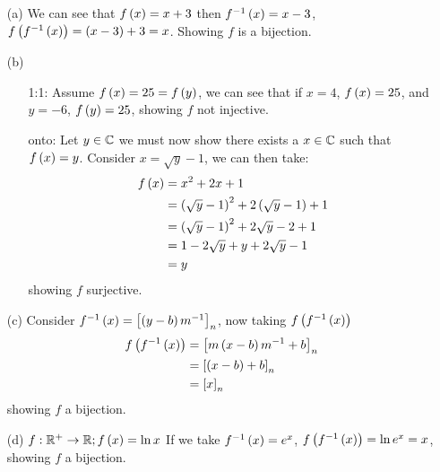 \begin{mdframed}[style=darkAnswer,frametitle={Joe Starr}]
  \begin{itemize}
    \item [(a)]{ We can see that $f\left(x\right)=x+3$ then $f^{-1}\left(x\right)=x-3$,
          $f\left(f^{-1}\left(x\right)\right)=\left(x-3\right)+3=x$. Showing $f$ is a bijection.
          }
    \item [(b)]{
          \begin{itemize}
            \item[1:1:]{\hspace{.5in}\newline
                  Assume $f\left(x\right)=25=f\left(y\right)$, we can see that if $x=4$, $f\left(x\right)=25$,
                  and $y=-6$, $f\left(y\right)=25$, showing $f$ not injective.
                  }
            \item[onto:]{\hspace{.5in}\newline
                  Let $y\in \mathbb{C}$ we must now show there exists a $x \in \mathbb{C}$ such that
                  $f\left(x\right)=y$. Consider $x=\sqrt{y}-1$, we can then take:
                  \begin{align*}
                    f\left(x\right) & = x^2+2x+1                               \\
                            & = \left(\sqrt{y}-1\right)^2+2\left(\sqrt{y}-1\right)+1 \\
                            & = \left(\sqrt{y}-1\right)^2+2\sqrt{y}-2+1       \\
                            & = 1 - 2 \sqrt{y} + y+2\sqrt{y}-1         \\
                            & =  y                                     \\
                  \end{align*}
                  showing $f$ surjective.
                  }
          \end{itemize}
          }
    \item [(c)]{
          Consider $f^{-1}\left(x\right)=\left[\left(y-b\right)m^{-1}\right]_n$, now taking
          $f\left(f^{-1}\left(x\right)\right)$
          \begin{align*}
            f\left(f^{-1}\left(x\right)\right) & = \left[m\left(x-b\right)m^{-1}+b\right]_n \\
                             & = \left[\left(x-b\right)+b\right]_n        \\
                             & = \left[x\right]_n                  \\
          \end{align*}
          showing $f$ a bijection.
          }
    \item [(d)]{
          $f:\mathbb{R}^+\to \mathbb{R}; f\left(x\right)=\ln x$
          If we take $f^{-1}\left(x\right)=e^x$, $f\left(f^{-1}\left(x\right)\right)=\ln e^x = x$, showing $f$
          a bijection.
          }
  \end{itemize}
\end{mdframed}
